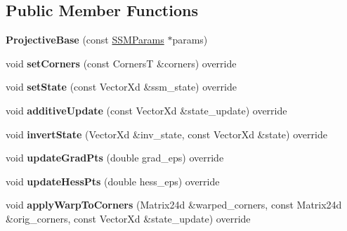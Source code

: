\subsection*{Public Member Functions}
\begin{DoxyCompactItemize}
\item 
\hypertarget{classProjectiveBase_aeff2258bfc60ed8235fa9f9c58b5ad93}{{\bfseries Projective\-Base} (const \hyperlink{structSSMParams}{S\-S\-M\-Params} $\ast$params)}\label{classProjectiveBase_aeff2258bfc60ed8235fa9f9c58b5ad93}

\item 
\hypertarget{classProjectiveBase_a4a872736ce6c05080fe1b1cca767b05d}{void {\bfseries set\-Corners} (const Corners\-T \&corners) override}\label{classProjectiveBase_a4a872736ce6c05080fe1b1cca767b05d}

\item 
\hypertarget{classProjectiveBase_a47d8b259d0c0e0b7320a33ea8a8df029}{void {\bfseries set\-State} (const Vector\-Xd \&ssm\-\_\-state) override}\label{classProjectiveBase_a47d8b259d0c0e0b7320a33ea8a8df029}

\item 
\hypertarget{classProjectiveBase_a95bef7c0dc68d1cffb0618e444915f6a}{void {\bfseries additive\-Update} (const Vector\-Xd \&state\-\_\-update) override}\label{classProjectiveBase_a95bef7c0dc68d1cffb0618e444915f6a}

\item 
\hypertarget{classProjectiveBase_ac6803fd1ba428d344b7b93e14931b9f2}{void {\bfseries invert\-State} (Vector\-Xd \&inv\-\_\-state, const Vector\-Xd \&state) override}\label{classProjectiveBase_ac6803fd1ba428d344b7b93e14931b9f2}

\item 
\hypertarget{classProjectiveBase_a2583799eea8a2581853b05ad831dd582}{void {\bfseries update\-Grad\-Pts} (double grad\-\_\-eps) override}\label{classProjectiveBase_a2583799eea8a2581853b05ad831dd582}

\item 
\hypertarget{classProjectiveBase_a883339ccb778bf2a8bf85fc7fef60e03}{void {\bfseries update\-Hess\-Pts} (double hess\-\_\-eps) override}\label{classProjectiveBase_a883339ccb778bf2a8bf85fc7fef60e03}

\item 
\hypertarget{classProjectiveBase_aae30cdd73ff9a19e7f667b25d8e28760}{void {\bfseries apply\-Warp\-To\-Corners} (Matrix24d \&warped\-\_\-corners, const Matrix24d \&orig\-\_\-corners, const Vector\-Xd \&state\-\_\-update) override}\label{classProjectiveBase_aae30cdd73ff9a19e7f667b25d8e28760}


\end{DoxyCompactItemize}
